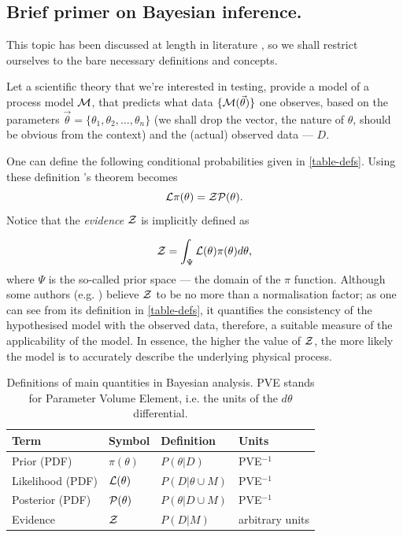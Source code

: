 \documentclass[usenatbib]{mnras}
\begin{document}
\subsection{Brief primer on Bayesian inference.}
\label{sec:org032e6e2}

This topic has been discussed at length in literature
\citep{jeffreys2010scientific}, so we shall restrict ourselves to the
bare necessary definitions and concepts.

Let a scientific theory that we're interested in testing, provide a
model of a process model \({\cal M}\), that predicts what data \(\lbrace {\cal M}(\vec{\theta})\rbrace\) one observes, based on the
parameters \(\vec{\theta} = \lbrace \theta_1, \theta_2, \ldots,
   \theta_n \rbrace\) (we shall drop the vector, the nature of
\(\theta\), should be obvious from the context) and the (actual)
observed data --- \(D\).

One can define the following conditional probabilities given
in \autoref{table-defs}. Using these definition \citeauthor{1763} 's theorem
becomes
\begin{equation}
 {\cal L} \pi (\theta) = {\cal Z} {\cal P} (\theta).
\label{eq:bayes} 
\end{equation}
Notice that the \emph{evidence} \({\cal Z}\) is implicitly defined as

\begin{equation}\label{eq:def-z}
 {\cal Z} = \int_{\Psi} {\cal L}(\theta) \pi(\theta) d\theta, 
\end{equation}
where \(\Psi\) is the so-called prior space --- the domain of the
\(\pi\) function. Although some authors
(e.g. \citeauthor{jeffreys2010scientific}) believe \({\cal Z}\) to be
no more than a normalisation factor; as one can see from its
definition in \autoref{table-defs}, it quantifies the consistency of
the hypothesised model with the observed data, therefore, a
suitable measure of the applicability of the model. In essence, the
higher the value of \({\cal Z}\), the more likely the model is to 
accurately describe the underlying physical process.

\begin{table}[htbp]
\caption{Definitions of main quantities in Bayesian analysis. PVE stands for Parameter Volume Element, i.e. the units of the \(d \theta\) differential.  \label{table-defs}}
\centering
\begin{tabular}{llll}
\textbf{\textbf{Term}} & \textbf{\textbf{Symbol}} & \textbf{\textbf{Definition}} & \textbf{\textbf{Units}}\\
\hline
Prior (PDF) & \(\pi(\theta)\) & \(P ( \theta  \vert D)\) & PVE\(^{-1}\)\\
Likelihood (PDF) & \({\cal L}(\theta)\) & \(P ( D \vert \theta \cup M)\) & PVE\(^{-1}\)\\
Posterior (PDF) & \({\cal P}(\theta)\) & \(P ( \theta \vert D \cup M)\) & PVE\(^{-1}\)\\
Evidence & \({\cal Z}\) & \(P ( D \vert M)\) & arbitrary units\\
\end{tabular}
\end{table}
\end{document}
